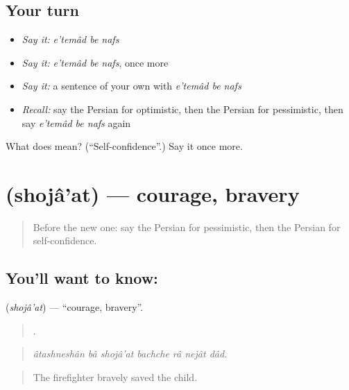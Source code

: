 \subsection*{Your turn}
\begin{itemize}
\raggedright
  \item \emph{Say it:} \emph{e'temâd be nafs}
  \item \emph{Say it:} \emph{e'temâd be nafs}, once more
  \item \emph{Say it:} a sentence of your own with \emph{e'temâd be nafs}
  \item \emph{Recall:} say the Persian for optimistic, then the Persian for pessimistic, then say \emph{e'temâd be nafs} again
\end{itemize}

\begin{tcolorbox}[breakable,colback=teal!4,colframe=teal!35!black,title={Before you move on}]
What does    mean? (\textquotedblleft{}Self-confidence\textquotedblright{}.) Say it once more.
\end{tcolorbox}
\section[\texorpdfstring{\fa{شجاعت} (shojâ'at)}{شجاعت (shojâ'at)}]{ (shojâ'at) — courage, bravery}

\label{lesson:FA-C487-shojaat}



\begin{quote}
Before the new one: say the Persian for pessimistic, then the Persian for self-confidence.
\end{quote}

\subsection*{You'll want to know: }
\textbf{} (\emph{shojâ'at}) — \textquotedblleft{}courage, bravery\textquotedblright{}.

\begin{quote}
       .
\end{quote}

\begin{quote}
\emph{âtashneshân bâ shojâ'at bachche râ nejât dâd.}
\end{quote}

\begin{quote}
The firefighter bravely saved the child.
\end{quote}

